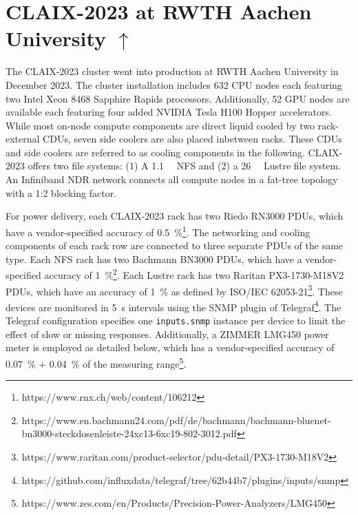 \section[CLAIX-2023 at RWTH Aachen University]{CLAIX-2023 at RWTH Aachen University \hyperref[tab:examples-overview]{$\uparrow$}}
\label{sec:example-rwth-claix-2023}

The CLAIX-2023 cluster went into production at RWTH Aachen University in December 2023.
The cluster installation includes 632 CPU nodes each featuring two Intel Xeon 8468 Sapphire Rapids processors.
Additionally, 52 GPU nodes are available each featuring four added NVIDIA Tesla H100 Hopper accelerators.
While most on-node compute components are direct liquid cooled by two rack-external \acp{CDU}, seven side coolers are also placed inbetween racks.
These \acp{CDU} and side coolers are referred to as cooling components in the following.
CLAIX-2023 offers two file systems: (1) A \SI{1.1}{\peta\byte} NFS and (2) a \SI{26}{\peta\byte} Lustre file system.
An Infiniband NDR network connects all compute nodes in a fat-tree topology with a 1:2 blocking factor.

For power delivery, each CLAIX-2023 rack has two Riedo RN3000 \acp{PDU}, which have a vendor-specified accuracy of \SI{0.5}{\percent}\footnote{https://www.rnx.ch/web/content/106212}.
The networking and cooling components of each rack row are connected to three separate \acp{PDU} of the same type.
Each NFS rack has two Bachmann BN3000 \acp{PDU}, which have a vendor-specified accuracy of \SI{1}{\percent}\footnote{https://www.en.bachmann24.com/pdf/de/bachmann/bachmann-bluenet-bn3000-steckdosenleiste-24xc13-6xc19-802-3012.pdf}.
Each Lustre rack has two Raritan PX3-1730-M18V2 \acp{PDU}, which have an accuracy of \SI{1}{\percent} as defined by ISO/IEC 62053-21\footnote{https://www.raritan.com/product-selector/pdu-detail/PX3-1730-M18V2}.
These devices are monitored in \SI{5}{\second} intervals using the \ac{SNMP} plugin of Telegraf\footnote{https://github.com/influxdata/telegraf/tree/62b44b7/plugins/inputs/snmp}.
The Telegraf configuration specifies one \texttt{inputs.snmp} instance per device to limit the effect of slow or missing responses.
Additionally, a ZIMMER LMG450 power meter is employed as detailed below, which has a vendor-specified accuracy of \SI{0.07}{\percent} + \SI{0.04}{\percent} of the measuring range\footnote{https://www.zes.com/en/Products/Precision-Power-Analyzers/LMG450}.

